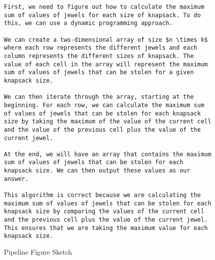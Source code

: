 \begin{figure*}
\begin{lstlisting}
First, we need to figure out how to calculate the maximum sum of values of jewels for each size of knapsack. To do this, we can use a dynamic programming approach. 

We can create a two-dimensional array of size $n \times k$ where each row represents the different jewels and each column represents the different sizes of knapsack. The value of each cell in the array will represent the maximum sum of values of jewels that can be stolen for a given knapsack size. 

We can then iterate through the array, starting at the beginning. For each row, we can calculate the maximum sum of values of jewels that can be stolen for each knapsack size by taking the maximum of the value of the current cell and the value of the previous cell plus the value of the current jewel. 

At the end, we will have an array that contains the maximum sum of values of jewels that can be stolen for each knapsack size. We can then output these values as our answer. 

This algorithm is correct because we are calculating the maximum sum of values of jewels that can be stolen for each knapsack size by comparing the values of the current cell and the previous cell plus the value of the current jewel. This ensures that we are taking the maximum value for each knapsack size.
\end{lstlisting}
\caption{Pipeline Figure Sketch}
\end{figure*}

